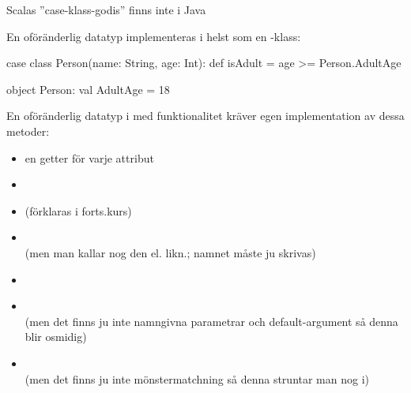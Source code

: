 \begin{Slide}{Scalas ''case-klass-godis'' finns inte i Java}
\ifkompendium\else
\SlideFontTiny\vspace{-0.5em}\begin{multicols}{2}
\fi 

En oföränderlig datatyp implementeras i  helst som en \pause{}-klass:

\begin{CodeSmall}[basicstyle=\ttfamily\SlideFontSize{5.7}{6.7}]
case class Person(name: String, age: Int):
  def isAdult = age >= Person.AdultAge

object Person:
  val AdultAge = 18
\end{CodeSmall}

\pause
\ifkompendium\else\columnbreak\fi

\noindent En oföränderlig datatyp i  med  funktionalitet kräver egen implementation av dessa metoder:
\ifkompendium\else\vspace{-0.25em}\fi
\begin{itemize}
\item en getter för varje attribut
\item {}
\item {} (förklaras i forts.kurs)
\item {} \\ (men man kallar nog den  el. likn.; namnet måste ju skrivas)
\item {}
\item {} \\ (men det finns ju inte namngivna parametrar och default-argument så denna blir osmidig)
\item {} \\ (men det finns ju inte mönstermatchning så denna struntar man nog i)
\end{itemize}

\ifkompendium\else
\end{multicols}
\fi
\end{Slide}





